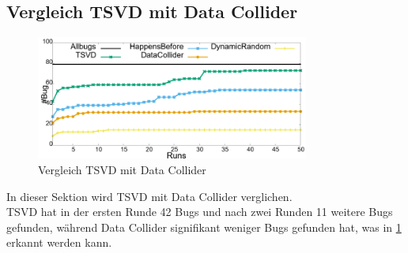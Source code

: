 \subsection*{Vergleich TSVD mit Data Collider}

\begin{figure}[ht]
    \centering
    \includegraphics[width=0.8\textwidth]{gfx/TSVDvDataCollider.png}
    \caption{Vergleich TSVD mit Data Collider \cite[173]{li_efficient_2019}}
    \label{fig:TSVDvDataCollider}
\end{figure}

In dieser Sektion wird \acs{TSVD} mit Data Collider verglichen. \\
\acs{TSVD} hat in der ersten Runde 42 Bugs und nach zwei Runden 11 weitere Bugs gefunden, während Data Collider signifikant weniger Bugs gefunden hat, was in \ref{fig:TSVDvDataCollider} erkannt werden kann.